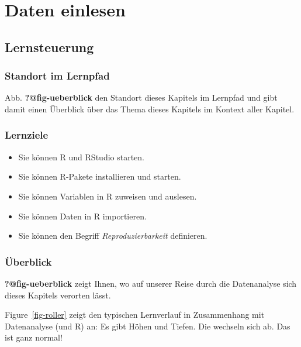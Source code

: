 \documentclass[
  letterpaper,
  DIV=11,
  numbers=noendperiod]{scrartcl}
\author{}
\date{}
\providecommand{\tightlist}{%
  \setlength{\itemsep}{0pt}\setlength{\parskip}{0pt}}\usepackage{longtable,booktabs,array}
\theoremstyle{definition}
\theoremstyle{definition}
\theoremstyle{definition}
\theoremstyle{remark}
\begin{document}
\section{Daten einlesen}\label{daten-einlesen}

\subsection{Lernsteuerung}\label{lernsteuerung}

\subsubsection{Standort im Lernpfad}\label{standort-im-lernpfad}

Abb. \textbf{?@fig-ueberblick} den Standort dieses Kapitels im Lernpfad
und gibt damit einen Überblick über das Thema dieses Kapitels im Kontext
aller Kapitel.

\subsubsection{Lernziele}\label{lernziele}

\begin{itemize}
\tightlist
\item
  Sie können R und RStudio starten.
\item
  Sie können R-Pakete installieren und starten.
\item
  Sie können Variablen in R zuweisen und auslesen.
\item
  Sie können Daten in R importieren.
\item
  Sie können den Begriff \emph{Reproduzierbarkeit} definieren.
\end{itemize}

\subsubsection{Überblick}\label{uxfcberblick}

\textbf{?@fig-ueberblick} zeigt Ihnen, wo auf unserer Reise durch die
Datenanalyse sich dieses Kapitels verorten lässt.

Figure~\ref{fig-roller} zeigt den typischen Lernverlauf in Zusammenhang
mit Datenanalyse (und R) an: Es gibt Höhen und Tiefen. Die wechseln sich
ab. Das ist ganz normal!
\end{document}
